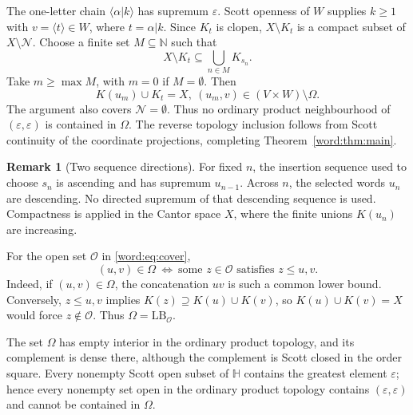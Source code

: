 \documentclass[fleqn,preprint,3p,a4paper]{elsarticle}
\theoremstyle{definition}
\newtheorem{remark}[theorem]{Remark}
\newcommand{\N}{\mathbb N}
\newcommand{\HH}{\mathbb H}
\begin{document}
The one-letter chain $\langle\alpha|k\rangle$ has supremum $\varepsilon$. Scott openness of $W$ supplies $k\geq1$ with $v=\langle t\rangle\in W$, where $t=\alpha|k$. Since $K_t$ is clopen, $X\setminus K_t$ is a compact subset of $X\setminus\mathcal N$. Choose a finite set $M\subseteq\N$ such that
\[
 X\setminus K_t\subseteq\bigcup_{n\in M}K_{s_n}.
\]
Take $m\geq\max M$, with $m=0$ if $M=\emptyset$. Then
\begin{equation}\label{word:eq:rectangle}
 K(u_m)\cup K_t=X,
 ~
 (u_m,v)\in(V\times W)\setminus\Omega.
\end{equation}
The argument also covers $\mathcal N=\emptyset$. Thus no ordinary product neighbourhood of $(\varepsilon,\varepsilon)$ is contained in $\Omega$. The reverse topology inclusion follows from Scott continuity of the coordinate projections, completing Theorem~\ref{word:thm:main}.

\begin{remark}[Two sequence directions]
For fixed $n$, the insertion sequence used to choose $s_n$ is ascending and has supremum $u_{n-1}$. Across $n$, the selected words $u_n$ are descending. No directed supremum of that descending sequence is used. Compactness is applied in the Cantor space $X$, where the finite unions $K(u_n)$ are increasing.
\end{remark}

For the open set $\mathcal O$ in \eqref{word:eq:cover},
\[
 (u,v)\in\Omega
 ~\Longleftrightarrow~
 \text{some }z\in\mathcal O\text{ satisfies }z\leq u,v.
\]
Indeed, if $(u,v)\in\Omega$, the concatenation $uv$ is such a common lower bound. Conversely, $z\leq u,v$ implies $K(z)\supseteq K(u)\cup K(v)$, so $K(u)\cup K(v)=X$ would force $z\notin\mathcal O$. Thus $\Omega=\mathrm{LB}_{\mathcal O}$.

The set $\Omega$ has empty interior in the ordinary product topology, and its complement is dense there, although the complement is Scott closed in the order square. Every nonempty Scott open subset of $\HH$ contains the greatest element $\varepsilon$; hence every nonempty set open in the ordinary product topology contains $(\varepsilon,\varepsilon)$ and cannot be contained in $\Omega$.
\end{document}
